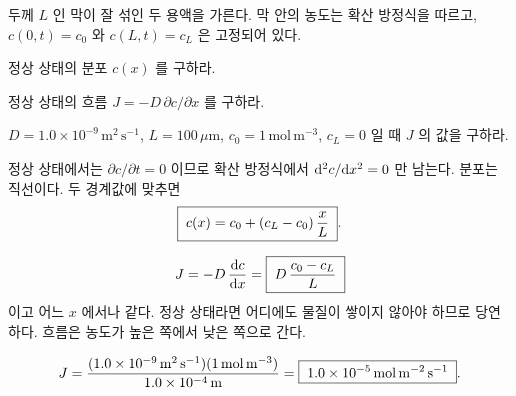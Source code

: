 

두께 $L$ 인 막이 잘 섞인 두 용액을 가른다. 막 안의 농도는 확산 방정식을
따르고, $c(0,t)=c_0$ 와 $c(L,t)=c_L$ 은 고정되어 있다.
\begin{parts}
  \item 정상 상태의 분포 $c(x)$ 를 구하라.
  \item 정상 상태의 흐름 $J=-D\,\partial c/\partial x$ 를 구하라.
  \item $D=1.0\times10^{-9}\,\mathrm{m^2\,s^{-1}}$,
        $L=100\,\mu\mathrm m$, $c_0=1\,\mathrm{mol\,m^{-3}}$, $c_L=0$ 일 때
        $J$ 의 값을 구하라.
\end{parts}

\solution

정상 상태에서는 $\partial c/\partial t=0$ 이므로 확산 방정식에서
$\mathrm{d}^2c/\mathrm{d} x^2=0$ 만 남는다. 분포는 직선이다. 두 경계값에 맞추면
\begin{equation}
  \boxed{\;c(x)=c_0+(c_L-c_0)\,\frac xL\;}.
\end{equation}

\begin{equation}
  J=-D\,\frac{\mathrm{d} c}{\mathrm{d} x}=\boxed{\;D\,\frac{c_0-c_L}{L}\;}
\end{equation}
이고 어느 $x$ 에서나 같다. 정상 상태라면 어디에도 물질이 쌓이지 않아야 하므로
당연하다. 흐름은 농도가 높은 쪽에서 낮은 쪽으로 간다.

\begin{equation}
  J=\frac{(1.0\times10^{-9}\,\mathrm{m^2\,s^{-1}})(1\,\mathrm{mol\,m^{-3}})}{1.0\times10^{-4}\,\mathrm m}
  =\boxed{\;1.0\times10^{-5}\,\mathrm{mol\,m^{-2}\,s^{-1}}\;}.
\end{equation}

